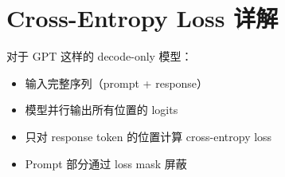 \section{Cross-Entropy Loss 详解}
对于 GPT 这样的 decode-only 模型：
\begin{itemize}
  \item 输入完整序列（prompt + response）
  \item 模型并行输出所有位置的 logits
  \item 只对 response token 的位置计算 cross-entropy loss
  \item Prompt 部分通过 loss mask 屏蔽
\end{itemize}

